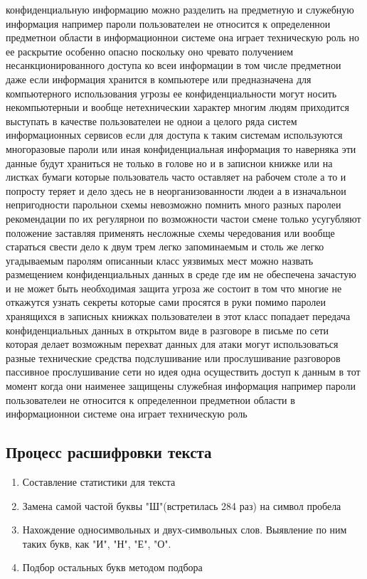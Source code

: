 \documentclass[a4paper, 14pt]{extarticle}
\begin{document}
конфиденциальную информацию можно разделить на предметную и служебную информация например пароли пользователеи не относится к определеннои предметнои области в информационнои системе она играет техническую роль но ее раскрытие особенно опасно поскольку оно чревато получением несанкционированного доступа ко всеи информации в том числе предметнои даже если информация хранится в компьютере или предназначена для компьютерного использования угрозы ее конфиденциальности могут носить некомпьютерныи и вообще нетехническии характер многим людям приходится выступать в качестве пользователеи не однои а целого ряда систем информационных сервисов если для доступа к таким системам используются многоразовые пароли или иная конфиденциальная информация то наверняка эти данные будут храниться не только в голове но и в записнои книжке или на листках бумаги которые пользователь часто оставляет на рабочем столе а то и попросту теряет и дело здесь не в неорганизованности людеи а в изначальнои непригодности парольнои схемы невозможно помнить много разных паролеи рекомендации по их регулярнои по возможности частои смене только усугубляют положение заставляя применять несложные схемы чередования или вообще стараться свести дело к двум трем легко запоминаемым и столь же легко угадываемым паролям описанныи класс уязвимых мест можно назвать размещением конфиденциальных данных в среде где им не обеспечена зачастую и не может быть необходимая защита угроза же состоит в том что многие не откажутся узнать секреты которые сами просятся в руки помимо паролеи хранящихся в записных книжках пользователеи в этот класс попадает передача конфиденциальных данных в открытом виде в разговоре в письме по сети которая делает возможным перехват данных для атаки могут использоваться разные технические средства подслушивание или прослушивание разговоров пассивное прослушивание сети но идея одна осуществить доступ к данным в тот момент когда они наименее защищены служебная информация например пароли пользователеи не относится к определеннои предметнои области в информационнои системе она играет техническую роль

\subsection{Процесс расшифровки текста}

\begin{enumerate}
    \item Составление статистики для текста
    \item Замена самой частой буквы "Ш"(встретилась 284 раз) на символ пробела
    \item Нахождение односимвольных и двух-символьных слов. Выявление по ним таких букв, как "И", "Н", "Е", "О".
    \item Подбор остальных букв методом подбора
\end{enumerate}
\end{document}
